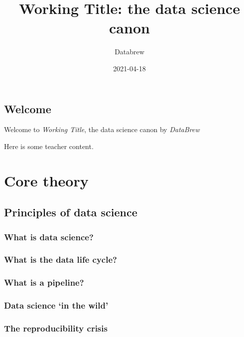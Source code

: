 \documentclass[
]{book}
\title{Working Title: the data science canon}
\author{Databrew}
\date{2021-04-18}
\begin{document}
\maketitle

{
\setcounter{tocdepth}{1}
\tableofcontents
}
\hypertarget{welcome}{%
\chapter{Welcome}\label{welcome}}

Welcome to \emph{Working Title}, the data science canon by \emph{DataBrew}

Here is some teacher content.

\hypertarget{part-core-theory}{%
\part{Core theory}\label{part-core-theory}}

\hypertarget{principles-of-data-science}{%
\chapter{Principles of data science}\label{principles-of-data-science}}

\hypertarget{what-is-data-science}{%
\section{What is data science?}\label{what-is-data-science}}

\hypertarget{what-is-the-data-life-cycle}{%
\section{What is the data life cycle?}\label{what-is-the-data-life-cycle}}

\hypertarget{what-is-a-pipeline}{%
\section{What is a pipeline?}\label{what-is-a-pipeline}}

\hypertarget{data-science-in-the-wild}{%
\section{Data science `in the wild'}\label{data-science-in-the-wild}}

\hypertarget{the-reproducibility-crisis}{%
\section{The reproducibility crisis}\label{the-reproducibility-crisis}}
\end{document}
